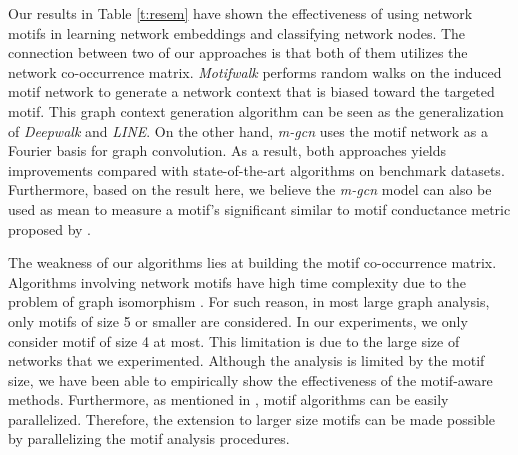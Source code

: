 \documentclass{article}
\theoremstyle{definition}
\begin{document}
Our results in Table \ref{t:resem} have shown the effectiveness of using network 
motifs in learning network embeddings and classifying network nodes. The connection 
between two of our approaches is that both of them utilizes the network 
co-occurrence matrix. \emph{Motifwalk} performs random walks on the induced motif 
network to generate a network context that is biased toward the targeted motif. 
This graph context
generation algorithm can be seen as the generalization of \emph{Deepwalk} and
\emph{LINE}. On the other hand, \emph{m-gcn} uses the motif network as a Fourier 
basis for graph convolution. As a result, both approaches yields improvements 
compared with state-of-the-art algorithms on benchmark datasets. Furthermore, based 
on the result here, we believe the \emph{m-gcn} model can also be used as mean to 
measure a motif's significant similar to motif conductance metric proposed by 
\citeauthor{juremotif}.

The weakness of our algorithms lies at building the motif co-occurrence matrix.
Algorithms involving network motifs have high time complexity due to
the problem of graph isomorphism \cite{motifdecrev}. 
For such reason, in most large graph
analysis, only motifs of size 5 or smaller are considered. In our 
experiments, we only consider motif of size 4 at most. This limitation is 
due to the large size of networks that we experimented. Although the
analysis is limited by the motif size, we have been able to empirically 
show the effectiveness of the motif-aware methods. Furthermore, as 
mentioned in \cite{juremotif}, motif algorithms can be easily 
parallelized. Therefore, the extension to larger size motifs can be made 
possible by parallelizing the motif analysis procedures.



\end{document}
